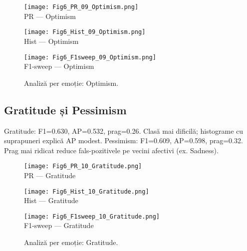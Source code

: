 \begin{figure}[H]
  \centering
  \begin{minipage}[t]{0.32\textwidth}\centering
    \texttt{[image: Fig6\_PR\_09\_Optimism.png]}\\[-1mm]
    {\scriptsize PR — Optimism}
  \end{minipage}\hfill
  \begin{minipage}[t]{0.32\textwidth}\centering
    \texttt{[image: Fig6\_Hist\_09\_Optimism.png]}\\[-1mm]
    {\scriptsize Hist — Optimism}
  \end{minipage}\hfill
  \begin{minipage}[t]{0.32\textwidth}\centering
    \texttt{[image: Fig6\_F1sweep\_09\_Optimism.png]}\\[-1mm]
    {\scriptsize F1-sweep — Optimism}
  \end{minipage}
  \caption{Analiză per emoție: Optimism.}
  \label{fig:c6-optimism}
\end{figure}

\subsection{Gratitude și Pessimism}
\noindent Gratitude: F1=0.630, AP=0.532, prag=0.26. Clasă mai dificilă; histograme cu suprapuneri explică AP modest.
\noindent Pessimism: F1=0.609, AP=0.598, prag=0.32. Prag mai ridicat reduce fals-pozitivele pe vecini afectivi (ex. Sadness).

\begin{figure}[H]
  \centering
  \begin{minipage}[t]{0.32\textwidth}\centering
    \texttt{[image: Fig6\_PR\_10\_Gratitude.png]}\\[-1mm]
    {\scriptsize PR — Gratitude}
  \end{minipage}\hfill
  \begin{minipage}[t]{0.32\textwidth}\centering
    \texttt{[image: Fig6\_Hist\_10\_Gratitude.png]}\\[-1mm]
    {\scriptsize Hist — Gratitude}
  \end{minipage}\hfill
  \begin{minipage}[t]{0.32\textwidth}\centering
    \texttt{[image: Fig6\_F1sweep\_10\_Gratitude.png]}\\[-1mm]
    {\scriptsize F1-sweep — Gratitude}
  \end{minipage}
  \caption{Analiză per emoție: Gratitude.}
  \label{fig:c6-gratitude}
\end{figure}

